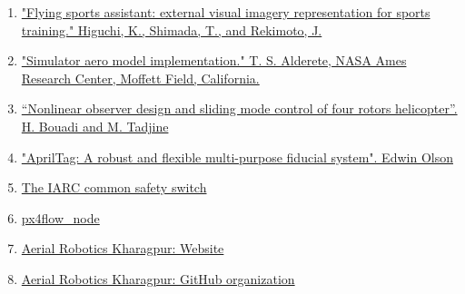 \documentclass[12pt]{article}
\begin{document}
\begin{enumerate}
    \item \href{https://www.researchgate.net/publication/220947254_Flying_sports_assistant_External_visual_imagery_representation_for_sports_training}{"Flying sports assistant: external visual imagery representation for sports training." Higuchi, K., Shimada, T., and Rekimoto, J.}
    \item \href{http://www.aviationsystemsdivision.arc.nasa.gov/publications/hitl/rtsim/Toms.pdf}{"Simulator aero model implementation." T. S. Alderete, NASA Ames Research Center, Moffett Field, California.}
    \item \href{https://www.researchgate.net/publication/228962656_Nonlinear_observer_design_and_sliding_mode_control_of_four_rotor_helicopter}{“Nonlinear observer design and sliding mode control of four rotors helicopter”. H. Bouadi and M. Tadjine} 
    \item \href{https://april.eecs.umich.edu/papers/details.php?name=olson2010tags}{"AprilTag: A robust and flexible multi-purpose fiducial system". Edwin Olson}
    \item \href{http://www.aerialroboticscompetition.org/downloads/killswitch.zip}{The IARC common safety switch}
    \item \href{http://wiki.ros.org/px4flow_node}{px4flow\_node}
    \item \href{http://quadrotor-iitkgp.github.io/}{Aerial Robotics Kharagpur: Website}
    \item \href{https://github.com/quadrotor-IITKgp}{Aerial Robotics Kharagpur: GitHub organization}
\end{enumerate}
\end{document}
